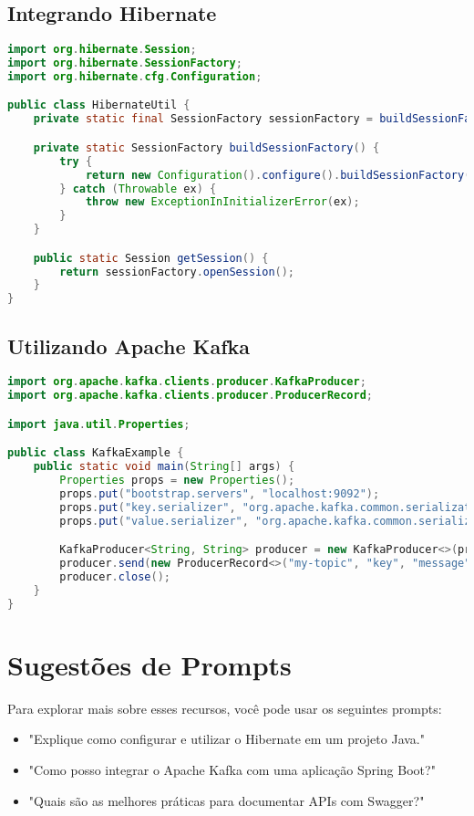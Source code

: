 \documentclass[a4paper,12pt]{book}
\begin{document}
\subsection{Integrando Hibernate}
\begin{lstlisting}[language=Java, caption=Exemplo de configuração do Hibernate]
import org.hibernate.Session;
import org.hibernate.SessionFactory;
import org.hibernate.cfg.Configuration;

public class HibernateUtil {
    private static final SessionFactory sessionFactory = buildSessionFactory();

    private static SessionFactory buildSessionFactory() {
        try {
            return new Configuration().configure().buildSessionFactory();
        } catch (Throwable ex) {
            throw new ExceptionInInitializerError(ex);
        }
    }

    public static Session getSession() {
        return sessionFactory.openSession();
    }
}
\end{lstlisting}

\subsection{Utilizando Apache Kafka}
\begin{lstlisting}[language=Java, caption=Exemplo de produção e consumo de mensagens com Kafka]
import org.apache.kafka.clients.producer.KafkaProducer;
import org.apache.kafka.clients.producer.ProducerRecord;

import java.util.Properties;

public class KafkaExample {
    public static void main(String[] args) {
        Properties props = new Properties();
        props.put("bootstrap.servers", "localhost:9092");
        props.put("key.serializer", "org.apache.kafka.common.serialization.StringSerializer");
        props.put("value.serializer", "org.apache.kafka.common.serialization.StringSerializer");

        KafkaProducer<String, String> producer = new KafkaProducer<>(props);
        producer.send(new ProducerRecord<>("my-topic", "key", "message"));
        producer.close();
    }
}
\end{lstlisting}

\section{Sugestões de Prompts}
Para explorar mais sobre esses recursos, você pode usar os seguintes prompts:
\begin{itemize}
  \item "Explique como configurar e utilizar o Hibernate em um projeto Java."
  \item "Como posso integrar o Apache Kafka com uma aplicação Spring Boot?"
  \item "Quais são as melhores práticas para documentar APIs com Swagger?"
\end{itemize}
\end{document}
